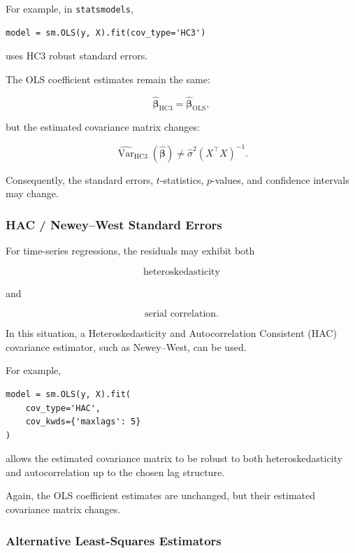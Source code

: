 For example, in \texttt{statsmodels},

\begin{verbatim}
model = sm.OLS(y, X).fit(cov_type='HC3')
\end{verbatim}

uses HC3 robust standard errors.

The OLS coefficient estimates remain the same:

\[
\boxed{
\widehat{\boldsymbol{\beta}}_{\mathrm{HC3}}
=
\widehat{\boldsymbol{\beta}}_{\mathrm{OLS}},
}
\]

but the estimated covariance matrix changes:

\[
\boxed{
\widehat{\operatorname{Var}}
_{\mathrm{HC3}}
(\widehat{\boldsymbol{\beta}})
\neq
\widehat{\sigma}^2
(X^\top X)^{-1}.
}
\]

Consequently, the standard errors, \(t\)-statistics, \(p\)-values, and
confidence intervals may change.



\subsubsection*{HAC / Newey--West Standard Errors}

For time-series regressions, the residuals may exhibit both

\[
\boxed{
\text{heteroskedasticity}
}
\]

and

\[
\boxed{
\text{serial correlation}.
}
\]

In this situation, a Heteroskedasticity and Autocorrelation Consistent
(HAC) covariance estimator, such as Newey--West, can be used.

For example,

\begin{verbatim}
model = sm.OLS(y, X).fit(
    cov_type='HAC',
    cov_kwds={'maxlags': 5}
)
\end{verbatim}

allows the estimated covariance matrix to be robust to both
heteroskedasticity and autocorrelation up to the chosen lag structure.

Again, the OLS coefficient estimates are unchanged, but their estimated
covariance matrix changes.

\subsubsection*{Alternative Least-Squares Estimators}


